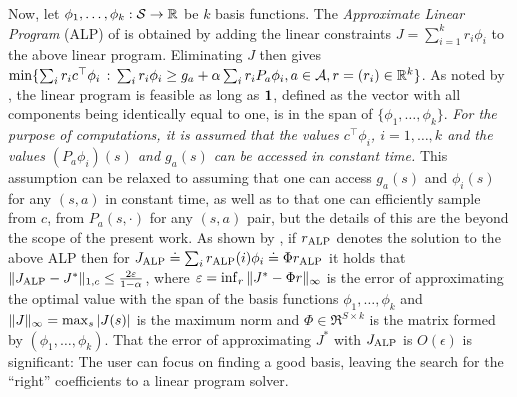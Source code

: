 Now, let $\phi_1,\ldots,\phi_k : \S \to \Re$ be $k$ basis functions. 
The \emph{Approximate Linear Program} (ALP) of \citet{SchSei85} 
is obtained by adding the linear constraints $J = \sum_{i=1}^k r_i \phi_i$ to the above linear program. Eliminating $J$ then gives $\min\{ \sum_i r_i c^\top \phi_i \,:\, \sum_i r_i \phi_i \ge g_a + \alpha \sum_i r_i P_a \phi_i, a\in \A, r = (r_i)\in \Re^k \}$.
As noted by \citet{SchSei85}, the linear program is feasible as long as $\one$, defined as the vector with all components being identically equal to one, is in the span of $\{\phi_1,\dots,\phi_k\}$. 
\emph{For the purpose of computations, it is assumed that the values $c^\top \phi_i$, $i=1,\dots, k$ and the values $(P_a \phi_i)(s)$ and $g_a(s)$ can be accessed in constant time.} 
This assumption can be relaxed to assuming that one can access $g_a(s)$ and $\phi_i(s)$ for any $(s,a)$ in constant time, as well as to that one can efficiently sample from $c$, from $P_a(s,\cdot)$ for any $(s,a)$ pair, 
but the details of this are the beyond the scope of the present work. As shown by \citet{ALP}, if $\ralp$ denotes the solution to the above ALP then for $\Jalp \doteq \sum_i \ralp(i) \phi_i \doteq \Phi \ralp$ it holds that $\norm{\Jalp - J^*}_{1,c} \le \frac{2 \epsilon}{1-\alpha}$, where $\epsilon = \inf_r \norm{ J^* - \Phi r }_\infty$ is the error of approximating the optimal value with the span of the basis functions $\phi_1,\dots,\phi_k$ and $\norm{J}_\infty = \max_s |J(s)|$ is the maximum norm and $\Phi \in \Re^{S\times k}$ is the matrix formed by $(\phi_1,\dots,\phi_k)$. That the error of approximating $J^*$ with $\Jalp$ is $O(\epsilon)$ is significant: The user can focus on finding a good basis, leaving the search for the ``right'' coefficients to a linear program solver.

